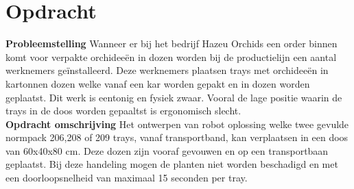 \section{Opdracht}
\begin{flushleft}
	\textbf{Probleemstelling}
	Wanneer er bij het bedrijf Hazeu Orchids een order binnen komt voor verpakte orchideeën in dozen worden bij de productielijn een aantal werknemers geïnstalleerd. Deze werknemers plaatsen trays met orchideeën in kartonnen dozen welke vanaf een kar worden gepakt en in dozen worden geplaatst. Dit werk is eentonig en fysiek zwaar. Vooral de lage positie waarin de trays in de doos worden gepaaltst is ergonomisch slecht.\\[0.5cm]
	
	
	\textbf{Opdracht omschrijving}
	Het ontwerpen van robot oplossing welke twee gevulde normpack  206,208 of 209 trays, vanaf transportband, kan verplaatsen in een doos van 60x40x80 cm. Deze dozen zijn vooraf gevouwen en op een transportbaan geplaatst. Bij deze handeling mogen de planten niet worden beschadigd en met een doorloopsnelheid van maximaal 15 seconden per tray.
	
	
\end{flushleft}